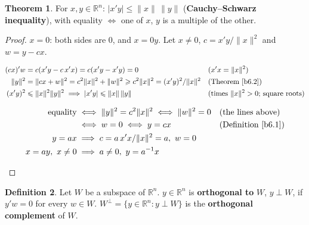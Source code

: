\documentclass[12pt]{article}
\newcommand{\R}{\mathbb R}
\theoremstyle{definition}
\newtheorem{theorem}{Theorem}
\newtheorem{definition}[theorem]{Definition}
\newcommand{\boardtop}{\vspace*{-\abovedisplayskip}}
\begin{document}
\begin{theorem}\label{b6.4}
For \(x,y\in\R^n\): \(\lvert x'y\rvert\leqslant\lVert x\rVert\,\lVert y\rVert\) (\textbf{Cauchy--Schwarz inequality}),
with equality \(\iff\) one of \(x\), \(y\) is a multiple of the other.
\end{theorem}
\begin{proof}
\(x=0\): both sides are \(0\), and \(x=0y\). Let \(x\ne0\), \(c=x'y/\lVert x\rVert^2\) and \(w=y-cx\).
\begin{board}[Inequality:]
\boardtop
\begin{align*}
(cx)'w&=c(x'y-c\,x'x)=c(x'y-x'y)=0&&(x'x=\lVert x\rVert^2)\\
\lVert y\rVert^2&=\lVert cx+w\rVert^2=c^2\lVert x\rVert^2+\lVert w\rVert^2\geqslant c^2\lVert x\rVert^2
=(x'y)^2/\lVert x\rVert^2&&\text{(Theorem~\ref{b6.2})}\\
(x'y)^2&\leqslant\lVert x\rVert^2\lVert y\rVert^2\implies\lvert x'y\rvert\leqslant\lVert x\rVert\,\lVert y\rVert
&&\text{(times \(\lVert x\rVert^2>0\); square roots)}
\end{align*}
\end{board}
\begin{board}[Equality:]
\boardtop
\begin{align*}
\text{equality}&\iff\lVert y\rVert^2=c^2\lVert x\rVert^2\iff\lVert w\rVert^2=0&&\text{(the lines above)}\\
&\iff w=0\iff y=cx&&\text{(Definition~\ref{b6.1})}\\
y=ax&\implies c=a\,x'x/\lVert x\rVert^2=a,\ w=0\\
x=ay,\ x\ne0&\implies a\ne0,\ y=a^{-1}x
\end{align*}
\end{board}
\nopagebreak
\end{proof}

\begin{definition}\label{b6.5}
Let \(W\) be a subspace of \(\R^n\). \(y\in\R^n\) is \textbf{orthogonal to} \(W\), \(y\perp W\), if \(y'w=0\) for every
\(w\in W\). \(W^\perp=\{y\in\R^n:y\perp W\}\) is the \textbf{orthogonal complement} of \(W\).
\end{definition}
\end{document}
